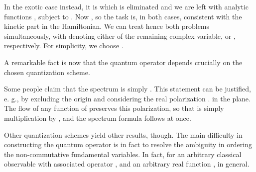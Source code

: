 \documentclass[a4paper,11pt]{article}
\providecommand{\const}{\mathop{\rm const}\nolimits}
\begin{document}
In the exotic case instead, it is \coordHE{} which is eliminated and we
are left with analytic functions \coordHE{},
subject to \coordHE{}. Now \coordHE{},
  so the task is,
in both cases, consistent with the kinetic part in the Hamiltonian.
We can treat hence both problems simultaneously,
with \coordHE{} denoting either of the remaining complex variable,
\coordHE{} or \coordHE{}, respectively.
For simplicity, we choose  \coordHE{}.

A remarkable fact is now that the quantum operator \coordHE{}
depends crucially on the chosen quantization scheme.

Some people \cite{BNS, HMC, GAMB2} claim that
the spectrum is simply \coordHE{}.
This statement can be justified, e. g.,
by excluding the origin and
considering the real polarization \myHighlight{$r=\const$}\coordHE{}. in the plane.
The flow of any function of \coordHE{} preserves this polarization, so that
  \coordHE{} is simply multiplication by \coordHE{}, and the
spectrum formula follows at once.

Other quantization schemes yield other results, though.
The main difficulty in constructing the quantum operator
\coordHE{} is in fact to resolve
the ambiguity in ordering the non-commutative fundamental
variables. In fact, for an arbitrary
classical observable \coordHE{} with  associated
operator \coordHE{}, and an arbitrary real function \coordHE{},
\coordHE{} in general.
\end{document}
